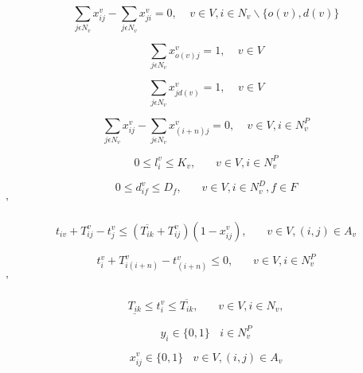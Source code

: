 \documentclass[a4paper,12pt]{article}
\begin{document}
\begin{equation} \label{eq:3}
\sum_{j\epsilon N_v}x_{ij}^v - \sum_{j\epsilon N_v} x_{ji}^v = 0, ~~~~~ v \in V, i\in N_v \backslash \{o(v), d(v)\} 
\end{equation}

\begin{equation} \label{eq:4}
\sum_{j\epsilon N_v} x_{o(v)j}^v = 1, ~~~~~ v \in V
\end{equation}

\begin{equation} \label{eq:5}
\sum_{j\epsilon N_v} x_{j d(v)}^v = 1, ~~~~~ v \in V
\end{equation}

\begin{equation} \label{eq:6}
\sum_{j\epsilon N_v}x_{ij}^v - \sum_{j\epsilon N_v} x_{(i+n)j}^v = 0, ~~~~~ v \in V, i\in N^P_v
\end{equation}

\begin{equation} \label{eq:7}
0 \leq l_{i}^v \leq K_v, ~~~~~~~~ v \in V, i \in N^P_v
\end{equation}

\begin{equation} \label{eq:8}
0 \leq d_{if}^v \leq D_f, ~~~~~~~~ v \in V, i \in N^D_v, f \in F
\end{equation}'

\begin{equation} \label{eq:9}
t_{iv} + T_{ij}^v - t_{j}^v \leq (\overline{T_{ik}} + T_{ij}^v)(1 - x_{ij}^v), ~~~~~~~~ v \in V, (i,j) \in A_v
\end{equation}

\begin{equation} \label{eq:10}
t_{i}^v + T_{i(i+n)}^v - t_{(i+n)}^v \leq 0, ~~~~~~~~ v \in V, i \in N^P_v
\end{equation}'

\begin{equation} \label{eq:13}
  \underline{T_{ik}} \leq t_{i}^v \leq  \overline{T_{ik}}, ~~~~~~~~ v \in V, i \in N_v,
\end{equation}

\begin{equation} \label{eq:14}
y_i \in \{0, 1\} ~~~~ i \in N_v^P
\end{equation}

\begin{equation} \label{eq:15}
x_{ij}^v \in \{0, 1\} ~~~~ v \in V, (i, j) \in A_v
\end{equation}
\end{document}
